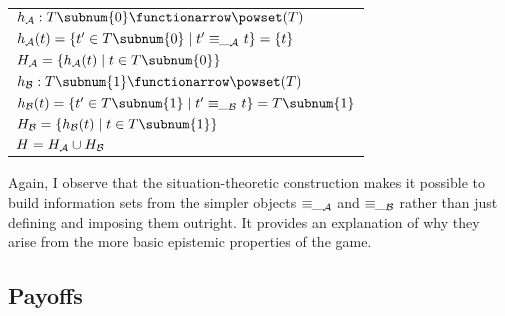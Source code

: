 \begin{definition} \begin{tabular}[t]{l} {$h_{\cal A}: T\subnum{0} \functionarrow \powset(T)$}\\ 
{$ h_{\cal A}(t) = \{ t' \in T\subnum{0} \mid
t' \equiv\!\!\__{\cal A}\,\, t \} = \{ t \} $}\\ 
\vspace{0.075in}
{$ H_{\cal A} = \{ h_{\cal A}(t) \mid t \in T\subnum{0} \} $} \\



{$h_{\cal B}: T\subnum{1} \functionarrow \powset(T)$}\\ 
{$ h_{\cal B}(t) = \{ t' \in T\subnum{1} \mid
t' \equiv\!\!\__{\cal B}\,\, t \} = T\subnum{1} $}\\ 
\vspace{0.075in}
{$ H_{\cal B} = \{ h_{\cal B}(t) \mid t \in T\subnum{1} \} $} \\




{$H = H_{\cal A} \cup H_{\cal B}$}

\end{tabular} 
\end{definition}

\noindent Again, I observe that the situation-theoretic construction makes it possible to build information sets from the simpler objects $\equiv\!\!\__{\cal A}$ and $\equiv\!\!\__{\cal B}$ rather than just defining and imposing them outright. It provides an explanation of why they arise from the more basic epistemic properties of the game.



\subsection{Payoffs}\label{sec:A.4.6}\largerpage[1]

